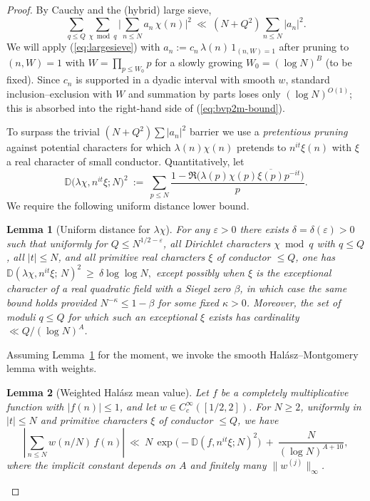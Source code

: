 \documentclass[11pt]{article}
\def\eqref#1{(\ref{#1})}%
\newtheorem{lemma}{Lemma}[part]
\theoremstyle{definition}
\theoremstyle{remark}
\numberwithin{equation}{part}
\begin{document}
\begin{proof}
	By Cauchy and the (hybrid) large sieve,
	\begin{equation}\label{eq:largesieve}
		\sum_{q\le Q}\sum_{\chi\bmod q}\Big|\sum_{n\le N}a_n\,\chi(n)\Big|^2 \ \ll\ (N+Q^2)\sum_{n\le N}|a_n|^2.
	\end{equation}
	We will apply \eqref{eq:largesieve} with
	\(
	a_n := c_n\,\lambda(n)\,1_{(n,W)=1}
	\)
	after pruning to $(n,W)=1$ with $W=\prod_{p\le W_0}p$ for a slowly growing $W_0=(\log N)^B$ (to be fixed). Since $c_n$ is supported in a dyadic interval with smooth $w$, standard inclusion--exclusion with $W$ and summation by parts loses only $(\log N)^{O(1)}$; this is absorbed into the right-hand side of \eqref{eq:bvp2m-bound}.

	To surpass the trivial $(N+Q^2)\sum|a_n|^2$ barrier we use a \emph{pretentious pruning} against potential characters for which $\lambda(n)\chi(n)$ pretends to $n^{it}\xi(n)$ with $\xi$ a real character of small conductor. Quantitatively, let
	\begin{equation}\label{eq:distance-def}
		\mathbb D\big(\lambda\chi, n^{it}\xi; N\big)^2\ :=\ \sum_{p\le N}\frac{1-\Re\big(\lambda(p)\chi(p)\overline{\xi(p)}p^{-it}\big)}{p}.
	\end{equation}
	We require the following uniform distance lower bound.
	\begin{lemma}[Uniform distance for $\lambda\chi$]\label{lem:distance}
		For any $\varepsilon>0$ there exists $\delta=\delta(\varepsilon)>0$ such that uniformly for $Q\le N^{1/2-\varepsilon}$, all Dirichlet characters $\chi\bmod q$ with $q\le Q$, all $|t|\le N$, and all primitive real characters $\xi$ of conductor $\le Q$, one has
		\(
		\mathbb D\!\left(\lambda\chi, n^{it}\xi;\,N\right)^2 \ \ge\ \delta\log\log N,
		\)
		except possibly when $\xi$ is the exceptional character of a real quadratic field with a Siegel zero $\beta$, in which case the same bound holds provided $N^{-\kappa}\le 1-\beta$ for some fixed $\kappa>0$. Moreover, the set of moduli $q\le Q$ for which such an exceptional $\xi$ exists has cardinality $\ll Q/(\log N)^A$.
	\end{lemma}

	Assuming Lemma~\ref{lem:distance} for the moment, we invoke the smooth Halász--Montgomery lemma with weights.
	\begin{lemma}[Weighted Halász mean value]\label{lem:halasz}
		Let $f$ be a completely multiplicative function with $|f(n)|\le 1$, and let $w\in C_c^\infty([1/2,2])$. For $N\ge2$, uniformly in $|t|\le N$ and primitive characters $\xi$ of conductor $\le Q$, we have
		\[
			\left|\sum_{n\le N} w(n/N)\,f(n)\right| \ \ll\ N\,\exp\!\big(-\mathbb D(f,n^{it}\xi;N)^2\big)\ +\ \frac{N}{(\log N)^{A+10}},
		\]
		where the implicit constant depends on $A$ and finitely many $\|w^{(j)}\|_\infty$.
	\end{lemma}


\end{proof}
\end{document}
